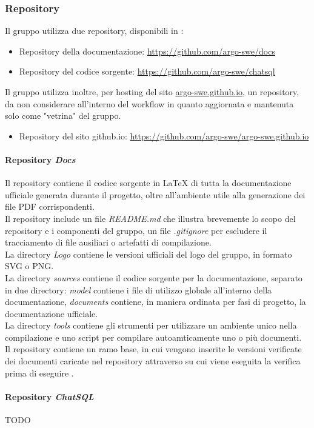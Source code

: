 \subsubsection{Repository}
Il gruppo utilizza due repository, disponibili in :
\begin{itemize}
  \item Repository della documentazione: \href{https://github.com/argo-swe/docs}{https://github.com/argo-swe/docs}
  \item Repository del codice sorgente: \href{https://github.com/argo-swe/chatsql}{https://github.com/argo-swe/chatsql}
\end{itemize}
Il gruppo utilizza inoltre, per hosting del sito \href{https://argo-swe.github.io}{argo-swe.github.io}, un repository, da non considerare all'interno del workflow in quanto aggiornata e mantenuta solo come "vetrina" del gruppo.
\begin{itemize}
  \item Repository del sito github.io: \href{https://github.com/argo-swe/argo-swe.github.io}{https://github.com/argo-swe/argo-swe.github.io}
\end{itemize}

\paragraph{Repository \emph{Docs}}
Il repository contiene il codice sorgente in LaTeX di tutta la documentazione ufficiale generata durante il progetto, oltre all'ambiente utile alla generazione dei file PDF corrispondenti.\\
Il repository include un file \emph{README.md} che illustra brevemente lo scopo del repository e i componenti del gruppo, un file \emph{.gitignore} per escludere il tracciamento di file ausiliari o artefatti di compilazione.\\
La directory \emph{Logo} contiene le versioni ufficiali del logo del gruppo, in formato SVG o PNG.\\
La directory \emph{sources} contiene il codice sorgente per la documentazione, separato in due directory: \emph{model} contiene i file di utilizzo globale all'interno della documentazione, \emph{documents} contiene, in maniera ordinata per fasi di progetto, la documentazione ufficiale.\\
La directory \emph{tools} contiene gli strumenti  per utilizzare un ambiente unico nella compilazione e uno script per compilare autoamticamente uno o più documenti.\\
\bigskip
Il repository contiene un ramo base, in cui vengono inserite le versioni verificate dei documenti caricate nel repository attraverso  su cui viene eseguita la verifica prima di eseguire .


\paragraph{Repository \emph{ChatSQL}}
TODO